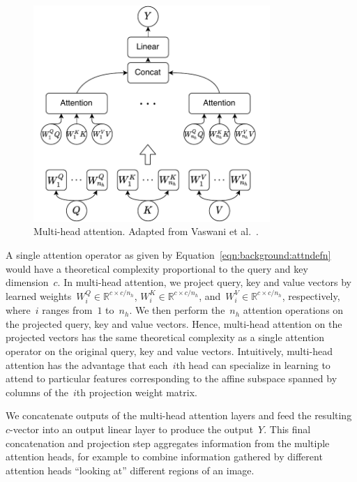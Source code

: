 \begin{figure}
\centering
\includegraphics[width=0.8\textwidth]{Figures/multihead-attention.pdf}
\caption{Multi-head attention.
         Adapted from Vaswani et al.~\cite{vaswani2017attention}.}
\label{fig:background:multiheadattn}
\end{figure}

A single attention operator as given by Equation~\ref{eqn:background:attndefn}
would have a theoretical complexity proportional to the query and key
dimension~$c$.
In multi-head attention, we project query, key and value vectors by learned
weights~$W^Q_i \in \mathbb{R}^{c\times c/n_h}$,
$W^K_i \in \mathbb{R}^{c\times c/n_h}$,
and~$W^V_i \in \mathbb{R}^{c\times c/n_h}$, respectively, where~$i$
ranges from~$1$ to~$n_h$.
We then perform the~$n_h$ attention operations on the projected query, key and
value vectors.
Hence, multi-head attention on the projected vectors has the same theoretical
complexity as a single attention operator on the original query, key and value
vectors.
Intuitively, multi-head attention has the advantage that each~$i$th head can
specialize in learning to attend to particular features corresponding to the
affine subspace spanned by columns of the~$i$th projection weight matrix.

We concatenate outputs of the multi-head attention layers and feed the
resulting~$c$-vector into an output linear layer to produce the output~$Y$.
This final concatenation and projection step aggregates information from the
multiple attention heads, for example to combine information gathered by
different attention heads ``looking at'' different regions of an image.



